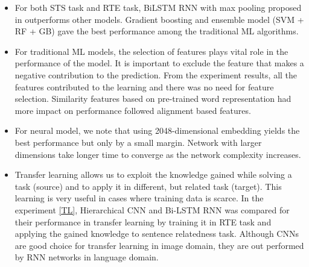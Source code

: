 \documentclass[12pt]{report} %
\begin{document}
\begin{itemize}
	\item For both STS task and RTE task, BiLSTM RNN with max pooling proposed in \cite{conneau2017supervised} outperforms other models. Gradient boosting and ensemble model (SVM + RF + GB) gave the best performance among the traditional ML algorithms.
	\item For traditional ML models, the selection of features plays vital role in the performance of the model. It is important to exclude the feature that makes a negative contribution to the prediction. From the experiment results, all the features contributed to the learning and there was no need for feature selection.  Similarity features based on pre-trained word representation had more impact on performance followed  alignment based features.
	\item For neural model, we note that using 2048-dimensional embedding yields the best performance but only by a small margin. Network with larger dimensions take longer time to converge as the network complexity increases.
	\item Transfer learning allows us to exploit the knowledge gained while solving a task (source) and to apply it in different, but related task (target). This learning is very useful in cases where training data is scarce. In the experiment \ref{TL}, Hierarchical CNN and Bi-LSTM RNN was compared for their performance in transfer learning by training it in RTE task and applying the gained knowledge to sentence relatedness task.  Although CNNs are good choice for transfer learning in image domain, they are out performed by RNN networks in language domain.
	
\end{itemize}
 





% 

%
\end{document}
